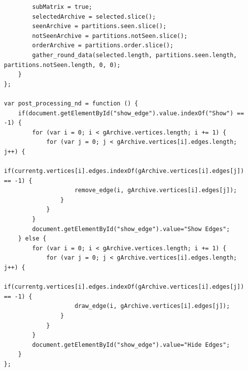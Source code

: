 \documentclass[12pt, twoside,a4paper,toc=bibliography]{scrbook}
\begin{document}
\begin{lstlisting}
        subMatrix = true;
        selectedArchive = selected.slice();
        seenArchive = partitions.seen.slice();
        notSeenArchive = partitions.notSeen.slice();
        orderArchive = partitions.order.slice();
        gather_round_data(selected.length, partitions.seen.length, partitions.notSeen.length, 0, 0);
    }
};

var post_processing_nd = function () {
    if(document.getElementById("show_edge").value.indexOf("Show") == -1) {
        for (var i = 0; i < gArchive.vertices.length; i += 1) {
            for (var j = 0; j < gArchive.vertices[i].edges.length; j++) {
                if(currentg.vertices[i].edges.indexOf(gArchive.vertices[i].edges[j]) == -1) {
                    remove_edge(i, gArchive.vertices[i].edges[j]);
                }
            }
        }
        document.getElementById("show_edge").value="Show Edges";
    } else {
        for (var i = 0; i < gArchive.vertices.length; i += 1) {
            for (var j = 0; j < gArchive.vertices[i].edges.length; j++) {
                if(currentg.vertices[i].edges.indexOf(gArchive.vertices[i].edges[j]) == -1) {
                    draw_edge(i, gArchive.vertices[i].edges[j]);
                }
            }
        }
        document.getElementById("show_edge").value="Hide Edges";
    }
};
\end{lstlisting}
\end{document}
